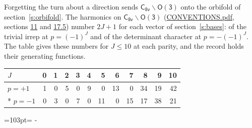 \documentclass[10pt,a4paper]{article}
\newcommand{\needspace}[1]{\par\penalty-100\begingroup\dimen0=#1\relax\dimen2=\pagegoal
  \advance\dimen2-\pagetotal\ifdim\dimen0>\dimen2\relax\ifdim\dimen2>0pt\vfil\break\fi\fi
  \endgroup}
\numberwithin{equation}{section}
\newcommand{\grp}[1]{\mathsf{#1}}
\begin{document}
Forgetting the turn about a direction sends $\grp{C_{8v}}\backslash\grp{O(3)}$ onto the orbifold of section~\ref{s:orbifold}.
The harmonics on $\grp{C_{8v}}\backslash\grp{O(3)}$ (\href{../../CONVENTIONS.pdf}{CONVENTIONS.pdf}, sections \href{../../CONVENTIONS.pdf\#conv.11}{11} and \href{../../CONVENTIONS.pdf\#conv.17.5}{17.5}) number $2J + 1$ for each vector of section~\ref{s:bases}: of the trivial irrep at $p = (-1)^J$ and of the determinant character at $p = -(-1)^J$. The table gives these numbers for $J \le 10$ at each parity, and the record holds their generating functions.
{\small\setlength{\tabcolsep}{4pt}\begin{longtable}{@{}lrrrrrrrrrrr@{}}\toprule
$J$ & 0 & 1 & 2 & 3 & 4 & 5 & 6 & 7 & 8 & 9 & 10\\\midrule\endhead
\bottomrule\endfoot\endlastfoot
$p = +1$ & 1 & 0 & 5 & 0 & 9 & 0 & 13 & 0 & 34 & 19 & 42\\*
$p = -1$ & 0 & 3 & 0 & 7 & 0 & 11 & 0 & 15 & 17 & 38 & 21\\
\bottomrule\end{longtable}}
\needspace{103pt}
\end{document}
